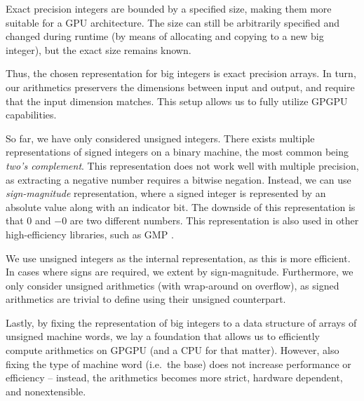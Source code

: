 Exact precision integers are bounded by a specified size, making them more
suitable for a GPU architecture. The size can still be arbitrarily specified and
changed during runtime (by means of allocating and copying to a new big
integer), but the exact size remains known.

Thus, the chosen representation for big integers is exact precision arrays. In
turn, our arithmetics preservers the dimensions between input and output, and
require that the input dimension matches. This setup allows us to fully utilize
GPGPU capabilities.
\newline

So far, we have only considered unsigned integers. There exists multiple
representations of signed integers on a binary machine, the most common being
\textit{two's complement}. This representation does not work well with multiple
precision, as extracting a negative number requires a bitwise negation. Instead,
we can use \textit{sign-magnitude} representation, where a signed integer is
represented by an absolute value along with an indicator bit. The downside of
this representation is that $0$ and $-0$ are two different numbers. This
representation is also used in other high-efficiency libraries, such as GMP
\cite{GMP}.

We use unsigned integers as the internal representation, as this is more
efficient. In cases where signs are required, we extent by
sign-magnitude. Furthermore, we only consider unsigned arithmetics (with
wrap-around on overflow), as signed arithmetics are trivial to define using
their unsigned counterpart.
\newline

Lastly, by fixing the representation of big integers to a data structure of
arrays of unsigned machine words, we lay a foundation that allows us to
efficiently compute arithmetics on GPGPU (and a CPU for that matter). However,
also fixing the type of machine word (i.e.\ the base) does not increase
performance or efficiency -- instead, the arithmetics becomes more strict,
hardware dependent, and nonextensible.


